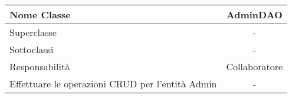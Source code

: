 
\setcounter{table}{0}
\begin{table}[H]
    \centering
    \begin{tabular}{||   l  ||  c   ||}
        \rowcolor{Gray}
        \rowcolor{Gray}
        \hline
        Nome Classe & AdminDAO\\
        \hline
        Superclasse  &  - \\
        \hline
        Sottoclassi & - \\
        \hline
         Responsabilità & Collaboratore \\
         \hline
          Effettuare le operazioni CRUD per l'entità Admin & - \\
         \hline
    \end{tabular}
\end{table}

    
       
